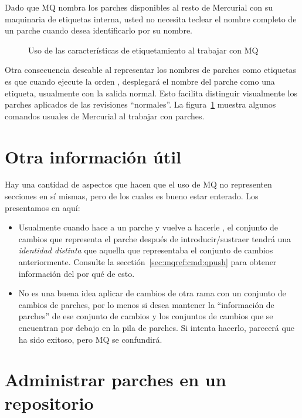 Dado que MQ nombra los parches disponibles al resto de Mercurial con
su maquinaria de etiquetas interna, usted no necesita teclear el
nombre completo de un parche cuando desea identificarlo por su nombre.

\begin{figure}[ht]
  \caption{Uso de las características de etiquetamiento al trabajar
    con MQ}
  \label{ex:mq:id}
\end{figure}

Otra consecuencia deseable al representar los nombres de parches como
etiquetas es que cuando ejecute la orden , desplegará el
nombre del parche como una etiqueta, usualmente con la salida normal.
Esto facilita distinguir visualmente los parches aplicados de las
revisiones ``normales''.  La figura~\ref{ex:mq:id} muestra algunos
comandos usuales de Mercurial al trabajar con parches.

\section{Otra información útil}

Hay una cantidad de aspectos que hacen que el uso de MQ no representen
secciones en sí mismas, pero de los cuales es bueno estar
enterado. Los presentamos en aquí:

\begin{itemize}
\item Usualmente cuando hace  a un parche y vuelve a
  hacerle , el conjunto de cambios que representa el
  parche después de introducir/sustraer tendrá una  \emph{identidad
    distinta} que aquella que representaba el conjunto de cambios
  anteriormente. Consulte la  secctión~\ref{sec:mqref:cmd:qpush} para
  obtener información del por qué de esto.
\item No es una buena idea aplicar  de cambios de otra
  rama con un conjunto de cambios de parches, por lo menos si desea
  mantener la ``información de parches'' de ese conjunto de cambios y
  los conjuntos de cambios que se encuentran por debajo en la pila de
  parches.  Si intenta hacerlo, parecerá que ha sido exitoso, pero MQ
  se confundirá.
\end{itemize}

\section{Administrar parches en un repositorio}
\label{sec:mq:repo}

